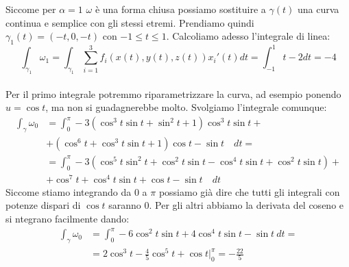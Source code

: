\documentclass[a4paper]{article}
\begin{document}
\begin{itemize}
Siccome per $\alpha = 1$ $\omega$ è una forma chiusa possiamo sostituire a $\gamma (t)$ una curva continua e semplice con gli stessi etremi. Prendiamo quindi $\gamma_1 (t) = (-t,0,-t)$ con $-1 \le t \le 1$. Calcoliamo adesso l'integrale di linea:
\begin{equation}
\int_{\gamma_1} \omega_1 = \int_{\gamma_1} \limits\sum_{i=1}^3 f_i(x(t), y(t), z(t)) x_i'(t) dt = \int_{-1}^{1} t - 2 dt = -4
\end{equation}
\\
Per il primo integrale potremmo riparametrizzare la curva, ad esempio ponendo $u = \cos t$, ma non si guadagnerebbe molto. Svolgiamo l'integrale comunque:
\begin{align}
\int_{\gamma} \omega_0 &= \int_{0}^{\pi} - 3(\cos^3 t \sin t + \sin^2 t + 1)\cos^3 t \sin t + \nonumber\\
&+ (\cos^6 t + \cos^3 t \sin t + 1)\cos t - \sin t \quad dt = \nonumber\\
&= \int_{0}^{\pi} -3(\cos^5 t \sin^2 t + \cos^2 t \sin t - \cos^4 t \sin t + \cos^2 t \sin t) + \nonumber\\
&+ \cos^7 t + \cos^4 t \sin t + \cos t -\sin t \quad dt 
\end{align}
Siccome stiamo integrando da $0$ a $\pi$ possiamo già dire che tutti gli integrali con potenze dispari di $\cos t$ saranno 0. Per gli altri abbiamo la derivata del coseno e si ntegrano facilmente dando:
\begin{align}
\int_{\gamma} \omega_0 &= \int_{0}^{\pi} -6\cos^2 t \sin t +4\cos^4 t \sin t - \sin t \: dt = \nonumber\\
&= 2\cos^3 t - \frac{4}{5} \cos^5 t + \cos t \Big|_{0}^{\pi} = -\frac{22}{5}
\end{align}

\end{itemize}
\end{document}

